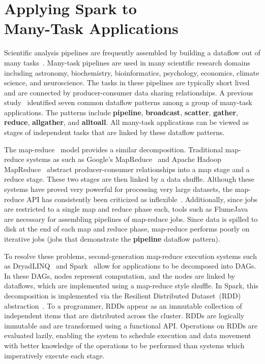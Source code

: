 \documentclass[10pt, conference, compsocconf]{IEEEtran}
\begin{document}
\section{Applying Spark to \\ Many-Task Applications}
\label{sec:Capability}

Scientific analysis pipelines are frequently assembled by building a dataflow out of many
tasks~\cite{katz11}. Many-task \linebreak pipelines are used in many scientific research
domains including astronomy, biochemistry, bioinformatics, psychology, economics, climate science,
and neuroscience. The tasks in these pipelines are typically short lived and are connected by
producer-consumer data sharing relationships. A previous study~\cite{katz11} identified
seven common dataflow patterns among a group of many-task applications. The patterns
include \textbf{pipeline}, \textbf{broadcast}, \textbf{scatter}, \textbf{gather},
\textbf{reduce}, \textbf{allgather}, and \textbf{alltoall}. All many-task applications
can be viewed as stages of independent tasks that are linked by these dataflow patterns.

The map-reduce~\cite{dean04} model provides a similar decomposition. Traditional map-reduce
systems as such as Google's MapReduce~\cite{dean04} and Apache Hadoop MapReduce~\cite{HADOOP} abstract
producer-consumer relationships into a map stage and a reduce stage. These two stages are then
linked by a data shuffle. Although these systems have proved very powerful for processing very
large datasets, the map-reduce API has consistently been criticized as inflexible~\cite{dewitt08}.
Additionally, since jobs are restricted to a single map and reduce phase each, tools such as
FlumeJava~\cite{chambers10} are necessary for assembling pipelines of map-reduce jobs. Since
data is spilled to disk at the end of each map and reduce phase, map-reduce performs poorly
on iterative jobs (jobs that demonstrate the \textbf{pipeline} dataflow pattern).

To resolve these problems, second-generation map-reduce execution systems such as
DryadLINQ~\cite{yu08} and Spark~\cite{zaharia12} allow for applications to be decomposed into
DAGs. In these DAGs, nodes represent computation, and the nodes are
linked by dataflows, which are implemented using a map-reduce style shuffle. In Spark,
this decomposition is implemented via the Resilient Distributed Dataset~(RDD)
abstraction~\cite{zaharia12}. To a programmer, RDDs appear as an immutable collection of independent
items that are distributed across the cluster. RDDs are logically immutable and are transformed using a
functional API. 
Operations on RDDs are evaluated lazily, enabling the system to schedule execution and data movement with better knowledge of the operations to be performed than systems which imperatively execute each stage.
\end{document}
